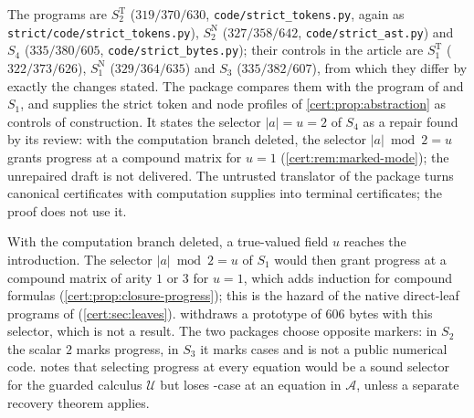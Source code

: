 The programs are $S^{\mathrm T}_2$ ($319/370/630$, \texttt{code/strict\_tokens.py},
again as \texttt{strict/code/strict\_tokens.py}), $S^{\mathrm N}_2$
($327/358/642$, \texttt{code/strict\_ast.py}) and $S_4$ ($335/380/605$,
\texttt{code/strict\_bytes.py}); their controls in the article are
$S^{\mathrm T}_1$ ($322/373/626$), $S^{\mathrm N}_1$ ($329/364/635$) and $S_3$
($335/382/607$), from which they differ by exactly the changes stated.
The package compares them with the program of  and $S_1$, and
supplies the strict token and node profiles of \cref{cert:prop:abstraction} as
controls of construction. It states the selector $\lvert a\rvert=u=2$ of $S_4$
as a repair found by its review: with the computation branch deleted, the
selector $\lvert a\rvert\bmod 2=u$ grants progress at a compound matrix for
$u=1$ (\cref{cert:rem:marked-mode}); the unrepaired draft is not delivered. The
untrusted translator of the package turns canonical certificates with
computation supplies into terminal certificates; the proof does not use it.

\begin{remark}\label{cert:rem:marked-mode}
With the computation branch deleted, a true-valued field $u$ reaches the
introduction. The selector $\lvert a\rvert\bmod 2=u$ of $S_1$ would then grant
progress at a compound matrix of arity $1$ or $3$ for $u=1$, which adds
induction for compound formulas (\cref{cert:prop:closure-progress}); this is the
hazard of the native direct-leaf programs of 
(\cref{cert:sec:leaves}).  withdraws a prototype of $606$
bytes with this selector, which is not a result. The two packages choose
opposite markers: in $S_2$ the scalar $2$ marks progress, in $S_3$ it marks cases
and is not a public numerical code.  notes that selecting
progress at every equation would be a sound selector for the guarded calculus
$\mathcal U$ but loses -case at an equation in $\mathcal A$, unless a
separate recovery theorem applies.
\end{remark}

